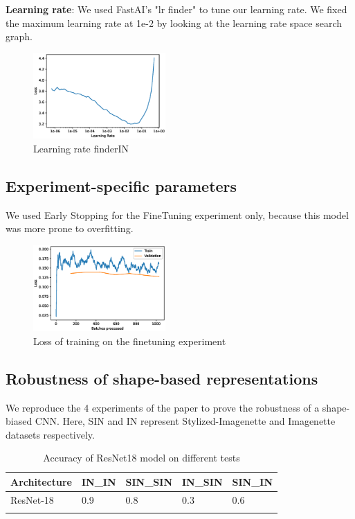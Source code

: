 \documentclass{article}
\begin{document}
\textbf{Learning rate}: We used FastAI's "lr finder" to tune our learning rate.
We fixed the maximum learning rate at 1e-2 by looking at the learning rate space search graph.
\begin{figure}[h!]
  \includegraphics[width = 0.45\textwidth]{imgs/lr_find.eps}
  \caption{Learning rate finder\texorpdfstring{\textrightarrow} .IN}
  \label{fig:loss_in}
\end{figure}

\subsection{Experiment-specific parameters}
We used Early Stopping for the FineTuning experiment only, because this model was more prone to overfitting.

\begin{figure}[h!]
  \includegraphics[width = 0.45\textwidth]{imgs/sinin/finetune/loss.eps}
  \caption{Loss of training on the finetuning experiment}
  \label{fig:loss_in}
\end{figure}

\subsection{Robustness of shape-based representations}

We reproduce the 4 experiments of the paper to prove the robustness of a shape-biased CNN.
Here, SIN and IN represent Stylized-Imagenette and Imagenette datasets respectively.

\begin{table}[h!]
  \begin{tabular}{lllll}
  \Xhline{2\arrayrulewidth}
  Architecture & IN\_IN & SIN\_SIN & IN\_SIN & SIN\_IN \\ \hline
  ResNet-18    & 0.9    & 0.8      & 0.3     & 0.6     \\ \Xhline{2\arrayrulewidth}
  \end{tabular}
  \caption{Accuracy of ResNet18 model on different tests}
\end{table}
\end{document}
